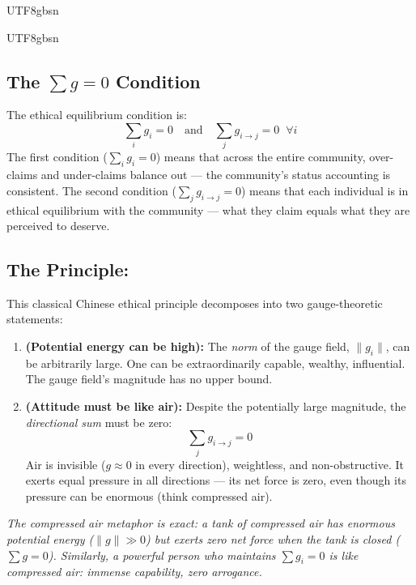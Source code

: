 \documentclass[11pt,a4paper]{article}
\begin{document}
\begin{CJK}{UTF8}{gbsn}
{\begin{CJK}{UTF8}{gbsn}
\subsection{The $\sum g = 0$ Condition}
The ethical equilibrium condition is:
\begin{equation}
    \boxed{\sum_i g_i = 0 \quad \text{and} \quad \sum_{j} g_{i \to j} = 0 \;\; \forall i}
\end{equation}
The first condition ($\sum_i g_i = 0$) means that across the entire community,
over-claims and under-claims balance out --- the community's status accounting is
consistent. The second condition ($\sum_j g_{i \to j} = 0$) means that each individual
is in ethical equilibrium with the community --- what they claim equals what they
are perceived to deserve.
\subsection{The Principle:}
This classical Chinese ethical principle decomposes into two gauge-theoretic statements:
\begin{enumerate}[label=(\alph*)]
    \item \textbf{ (Potential energy can be high):} The \textit{norm} of the
          gauge field, $\|g_i\|$, can be arbitrarily large. One can be extraordinarily
          capable, wealthy, influential. The gauge field's magnitude has no upper bound.
    \item \textbf{ (Attitude must be like air):} Despite the potentially
          large magnitude, the \textit{directional sum} must be zero:
          \begin{equation}
              \sum_j g_{i \to j} = 0
          \end{equation}
          Air is invisible ($g \approx 0$ in every direction), weightless, and
          non-obstructive. It exerts equal pressure in all directions --- its net
          force is zero, even though its pressure can be enormous (think compressed air).
\end{enumerate}
\textit{The compressed air metaphor is exact: a tank of compressed air has enormous
potential energy ($\|g\| \gg 0$) but exerts zero net force when the tank is closed
($\sum g = 0$). Similarly, a powerful person who maintains $\sum g_i = 0$ is like
compressed air: immense capability, zero arrogance.}

\end{CJK}}
\end{CJK}
\end{document}
